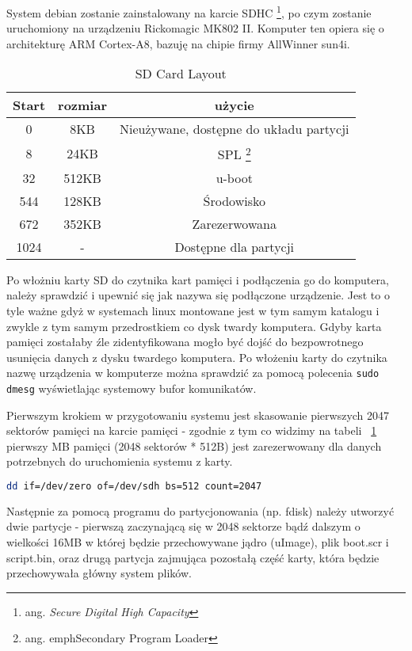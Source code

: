 System debian zostanie zainstalowany na karcie SDHC \footnote{ang. \em{Secure Digital High Capacity}}, po czym zostanie uruchomiony na urządzeniu Rickomagic MK802 II. Komputer ten opiera się o architekturę ARM Cortex-A8, bazuję na chipie firmy AllWinner sun4i.
\par
	\begin{table}[t]
		\centering
		\caption{SD Card Layout}
		\label{tab:sd-layout}
	\begin{tabular}{|c|c|c|}
	\hline
	\textbf{Start} & \textbf{rozmiar} & \textbf{użycie} \\ 
	\hline
	0 & 8KB & Nieużywane, dostępne do układu partycji \\
	\hline
	8 & 24KB & SPL \footnote{ang. emph{Secondary Program Loader}} \\
	\hline
	32 & 512KB & u-boot \\
	\hline
	544 & 128KB & Środowisko \\
	\hline
	672 & 352KB & Zarezerwowana \\
	\hline
	1024 & - & Dostępne dla partycji \\
	\hline
	
	
\end{tabular}
\end{table}

\par
Po włożniu karty SD do czytnika kart pamięci i podłączenia go do komputera, należy sprawdzić i upewnić się jak nazywa się podłączone urządzenie. Jest to o tyle ważne gdyż w systemach linux montowane jest w tym samym katalogu i zwykle z tym samym przedrostkiem co dysk twardy komputera. Gdyby karta pamięci zostałaby źle zidentyfikowana mogło być dojść do bezpowrotnego usunięcia danych z dysku twardego komputera. Po włożeniu karty do czytnika nazwę urządzenia w komputerze można sprawdzić za pomocą polecenia \lstinline{sudo dmesg} wyświetlając systemowy bufor komunikatów. 
\par
Pierwszym krokiem w przygotowaniu systemu jest skasowanie pierwszych 2047 sektorów pamięci na karcie pamięci - zgodnie z tym co widzimy na tabeli ~\ref{tab:sd-layout} pierwszy MB pamięci (2048 sektorów * 512B) jest zarezerwowany dla danych potrzebnych do uruchomienia systemu z karty.
\par
\begin{lstlisting}[language=bash]
dd if=/dev/zero of=/dev/sdh bs=512 count=2047
\end{lstlisting}
\par
Następnie za pomocą programu do partycjonowania (np. fdisk) należy utworzyć dwie partycje - pierwszą zaczynającą się w 2048 sektorze bądź dalszym o wielkości 16MB w której będzie przechowywane jądro (uImage), plik boot.scr i script.bin, oraz drugą partycja zajmująca pozostałą część karty, która będzie przechowywała główny system plików.
\par

